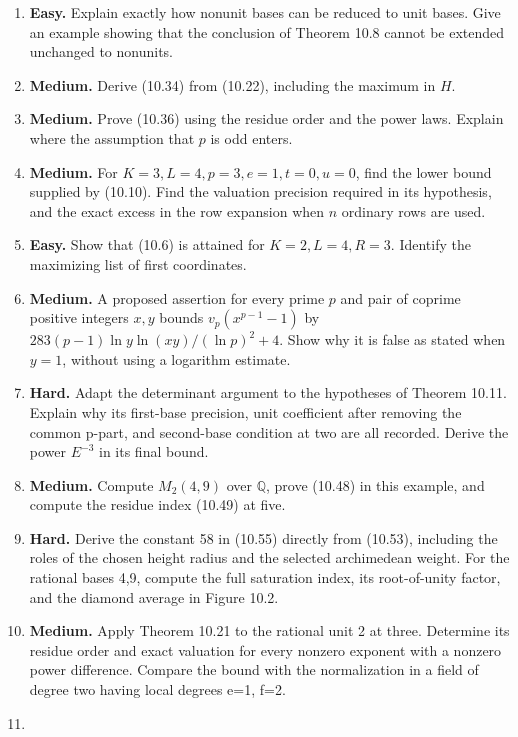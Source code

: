 \documentclass[
  11pt,
  a4paper,
]{article}
\begin{document}
\begin{enumerate}
\def\labelenumi{\arabic{enumi}.}
\item
  \textbf{Easy.} Explain exactly how nonunit bases can be reduced to
  unit bases. Give an example showing that the conclusion of Theorem
  10.8 cannot be extended unchanged to nonunits.
\item
  \textbf{Medium.} Derive (10.34) from (10.22), including the maximum in
  \(H\).
\item
  \textbf{Medium.} Prove (10.36) using the residue order and the power
  laws. Explain where the assumption that \(p\) is odd enters.
\item
  \textbf{Medium.} For \(K=3,L=4,p=3,e=1,t=0,u=0\), find the lower bound
  supplied by (10.10). Find the valuation precision required in its
  hypothesis, and the exact excess in the row expansion when \(n\)
  ordinary rows are used.
\item
  \textbf{Easy.} Show that (10.6) is attained for \(K=2,L=4,R=3\).
  Identify the maximizing list of first coordinates.
\item
  \textbf{Medium.} A proposed assertion for every prime \(p\) and pair
  of coprime positive integers \(x,y\) bounds \(v_p(x^{p-1}-1)\) by
  \(283(p-1)\ln y\ln(xy)/(\ln p)^2+4\). Show why it is false as stated
  when \(y=1\), without using a logarithm estimate.
\item
  \textbf{Hard.} Adapt the determinant argument to the hypotheses of
  Theorem 10.11. Explain why its first-base precision, unit coefficient
  after removing the common p-part, and second-base condition at two are
  all recorded. Derive the power \(E^{-3}\) in its final bound.
\item
  \textbf{Medium.} Compute \(M_2(4,9)\) over \(\mathbb Q\), prove
  (10.48) in this example, and compute the residue index (10.49) at
  five.
\item
  \textbf{Hard.} Derive the constant 58 in (10.55) directly from
  (10.53), including the roles of the chosen height radius and the
  selected archimedean weight. For the rational bases 4,9, compute the
  full saturation index, its root-of-unity factor, and the diamond
  average in Figure 10.2.
\item
  \textbf{Medium.} Apply Theorem 10.21 to the rational unit 2 at three.
  Determine its residue order and exact valuation for every nonzero
  exponent with a nonzero power difference. Compare the bound with the
  normalization in a field of degree two having local degrees e=1, f=2.
\item

\end{enumerate}
\end{document}
